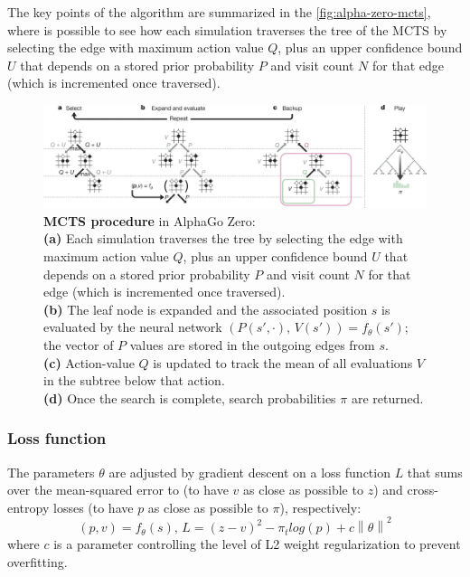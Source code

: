 \documentclass{article}
\newcommand{\norm}[1]{\left\lVert#1\right\rVert}
\begin{document}
The key points of the algorithm are summarized in the \autoref{fig:alpha-zero-mcts}, where is possible to see how each simulation traverses the tree of the MCTS by selecting the edge with maximum action value $Q$, plus an upper confidence bound $U$ that depends on a stored prior probability $P$ and visit count $N$ for that edge (which is incremented once traversed).
\begin{figure}[H]
	\centerline{\includegraphics[width=15cm]{alpha-zero-mcts.png}}
	\caption{\textbf{MCTS procedure} in AlphaGo Zero\cite{Silver_2016}:\\ \textbf{(a)} Each simulation traverses the tree by selecting the edge with maximum action value $Q$, plus an upper confidence bound $U$ that depends on a stored prior probability $P$ and visit count $N$ for that edge (which is incremented once traversed).\\ \textbf{(b)} The leaf node is expanded and the associated position $s$ is evaluated by the neural network $(P(s', \cdot), \, V(s')) = f_\theta(s')$; the vector of $P$ values are stored in the outgoing edges from $s$.\\ \textbf{(c)} Action-value $Q$ is updated to track the mean of all evaluations $V$ in the subtree below that action.\\ \textbf{(d)} Once the search is complete, search probabilities $\pi$ are returned.}
	\label{fig:alpha-zero-mcts}
\end{figure}

\subsubsection{Loss function}
The parameters $\theta$ are adjusted by gradient descent on a loss function $L$ that sums over the mean-squared error to (to have $v$ as close as possible to $z$) and cross-entropy losses (to have $p$ as close as possible to $\pi$), respectively:
\begin{equation}\label{eq:loss_function_alphazero}
	(p,v) = f_\theta(s),\, L = (z-v)^2 - \pi_t log(p) + c \norm{\theta}^2
\end{equation}
where $c$ is a parameter controlling the level of L2 weight regularization to prevent overfitting.
\end{document}
